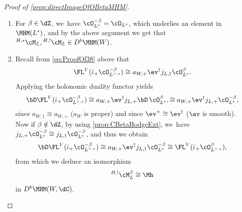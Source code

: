 \begin{proof}[Proof of \cref{prop:directImageOfOBetaMHM}]
\begin{enumerate}
On the spaces $V$ and $L^{\vee,*}$, we~consider the isomorphisms $c_V$ and $c_{L^{\vee,*}}$ given by multiplication by $-1$ (in all variables for $c_V$ and fiberwise for~$c_{L^{\vee,*}}$). Then since the Fourier transformation $\FL^V$ and the holonomic duality commute up to the action of~$c_V$ (\ie since
$\bD\, \circ \FL^V\cong \FL^V\circ\bD\circ c_V^+$), we~obtain the following isomorphisms in $D^b(\cD_W)$ for the complex of $\cD_W$\nobreakdash-mod\-ules underlying $\MhD$:
\begin{align*}
\bD \FL^V(\hat{\iota}_+ \cO^\beta_{L^{\vee,*}}) &\simeq \FL^V \bD \, c^+_V (\hat{\iota}_+ \cO^\beta_{L^{\vee,*}}) \\
&\simeq \FL^V \bD (\hat{\iota}_+ c^+_{L^{\vee,*}} \cO^\beta_{L^{\vee,*}}) &
\begin{array}{l}
\textup{since } c_V\circ\hat{\iota}=\hat{\iota}\circ c_{L^{\vee,*}}\\ \textup{by definition of }\hat{\iota}
\end{array}
\\
&\simeq \FL^V \bD (\hat{\iota}_+ \cO^\beta_{L^{\vee,*}})
&{\exists\textup{ isom. } c^+_{L^{\vee,*}}\cO^\beta_{L^{\vee,*}}\cong \cO^\beta_{L^{\vee,*}}} \\
& \simeq \FL^V (\hat{\iota}_\dag \bD\, \cO^\beta_{L^{\vee,*}}) &
{\bD\, \hat{\iota}_+ \cong \hat{\iota}_\dag\,\bD}\\
& \simeq \FL^V (\hat{\iota}_\dag \cO^{-\beta}_{L^{\vee,*}})
& {\bD\, \cO^\beta_{L^{\vee,*}}\cong \cO^{-\beta}_{L^{\vee,*}} \textup{ by \cref{lem:OLbetaDual}}}.
\end{align*}
This shows that $\FL^V (\hat{\iota}_\dag \cO^{-\beta}_{L^{\vee,*}})$ is the complex of $\cD_W$\nobreakdash-mod\-ules underlying the object $\MhD$, as claimed.

The second statement follows directly from the fact that $\cO_{L^*}^\beta\cong\cO_{L^*}^{\beta'}$ for $\beta-\beta'\in \Z$.
\item
For $\beta\in \dZ$, we~have $\cO_{L^*}^{-\beta}=\cO_{L^*}$, which underlies an element in $\MHM(L^*)$, and by the above argument we get that
${^{H,*}}\cM_L, {^{H,!}}\cM_L \in D^b\MHM(W)$.
\item
Recall from \eqref{eq:ProofOf38} above that
\[
\FL^V(\hat{\iota}_+\cO_{L^{\vee,*}}^{-\beta}) \cong a_{W,+} \ev^\dag j_{L,\dag} \cO_{L^*}^\beta.
\]
Applying the holonomic duality functor yields
\[
\bD \FL^V(\hat{\iota}_+\cO_{L^{\vee,*}}^{-\beta})
\cong
a_{W,+} \ev^\dag j_{L,+} \bD \, \cO_{L^*}^\beta,
\cong
a_{W,+} \ev^\dag j_{L,+} \cO_{L^*}^{-\beta},
\]
since $a_{W,\dag}\cong a_{W,+}$ ($a_W$ is proper) and since $\ev^+\cong \ev^\dag$ ($\ev$ is smooth). Now if $\beta\notin\dZ$, by using \cref{prop:CBetaHodgeExt}, we~have $j_{L,+}\cO_{L^*}^{-\beta} \cong j_{L,\dag}\cO_{L^*}^{-\beta}$, and thus we obtain
\[
\bD \FL^V(\hat{\iota}_+\cO_{L^{\vee,*}}^{-\beta})
\cong
a_{W,+} \ev^\dag j_{L,\dag} \cO_{L^*}^{-\beta}
\cong
\FL^V(\hat{\iota}_+\cO_{L^{\vee,*}}^{\beta}),
\]
from which we deduce an isomorphism
\[
{^{H,!}}\cM_L^{\beta} \cong \Mh
\]
in $D^b\MHM(W,\dC)$.


\end{enumerate}
\end{proof}
